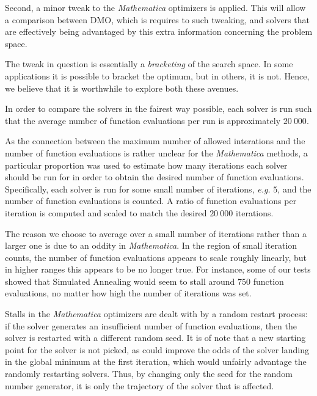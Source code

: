 \documentclass[12pt]{article}
\begin{document}
Second, a minor tweak to the \emph{Mathematica} optimizers is applied. This
will allow a comparison between DMO, which is requires to such tweaking,
and solvers that are effectively being advantaged by this extra information
concerning the problem space.

The tweak in question is essentially a \emph{bracketing} of the search
space. In some applications it is possible to bracket the optimum, but in
others, it is not. Hence, we believe that it is worthwhile to explore both
these avenues.

In order to compare the solvers in the fairest way possible, each solver is
run such that the average number of function evaluations per run is
approximately $20~000$.

As the connection between the maximum number of allowed interations and the
number of function evaluations is rather unclear for the \emph{Mathematica}
methods, a particular proportion was used to estimate how many iterations
each solver should be run for in order to obtain the desired number of
function evaluations.
Specifically, each solver is run for some small number of iterations,
\emph{e.g.} $5$, and the number of function evaluations is counted.
A ratio of function evaluations per iteration is computed and scaled to
match the desired $20~000$ iterations.

The reason we choose to average over a small number of iterations rather
than a larger one is due to an oddity in \emph{Mathematica}.
In the region of small iteration counts, the number of function evaluations
appears to scale roughly linearly, but in higher ranges this appears to be
no longer true.
For instance, some of our tests showed that Simulated Annealing would seem
to stall around $750$ function evaluations, no matter how high the number
of iterations was set.

Stalls in the \emph{Mathematica} optimizers are dealt with by a random
restart process: if the solver generates an insufficient number of function
evaluations, then the solver is restarted with a different random seed.
It is of note that a new starting point for the solver is not picked, as
could improve the odds of the solver landing in the global minimum at the
first iteration, which would unfairly advantage the randomly restarting
solvers. Thus, by changing only the seed for the random number generator,
it is only the trajectory of the solver that is affected.

\pagebreak
\end{document}

